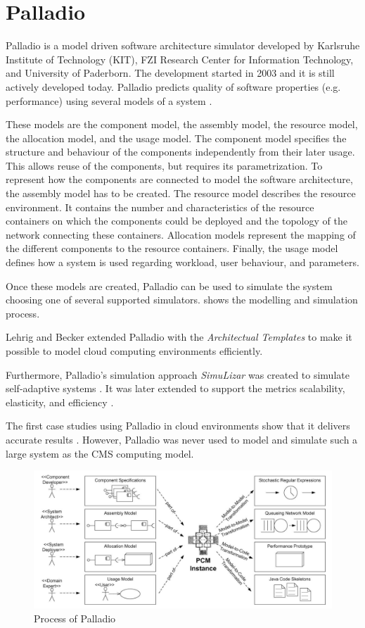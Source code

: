 \section{Palladio}
\label{palladio}
Palladio is a model driven software architecture simulator developed by Karlsruhe Institute of Technology (KIT), FZI Research Center for Information Technology, and University of Paderborn. The development started in 2003 and it is still actively developed today. Palladio predicts quality of software properties (e.g. performance) using several models of a system \cite{BECKER20093}.

These models are the component model, the assembly model, the resource model, the allocation model, and the usage model.
The component model specifies the structure and behaviour of the components independently from their later usage. This allows reuse of the components,  but requires its parametrization.
To represent how the components are connected to model the software architecture, the assembly model has to be created. 
The resource model describes the resource environment. It contains the number and characteristics of the resource containers on which the components could be deployed and the topology of the network connecting these containers.
Allocation models represent the mapping of the different components to the resource containers.
Finally, the usage model defines how a system is used regarding workload, user behaviour, and parameters.

Once these models are created, Palladio can be used to simulate the system choosing one of several supported simulators.  shows the modelling and simulation process. 

Lehrig and Becker \cite{arch} extended Palladio with the \textit{Architectual Templates} to make it possible to model cloud computing environments efficiently.

Furthermore, Palladio's simulation approach \textit{SimuLizar} was created to simulate self-adaptive systems \cite{becker2013simulizar}.
It was later extended to support the metrics scalability, elasticity, and efficiency \cite{arch}.

The first case studies using Palladio in cloud environments show that it delivers accurate results \cite{arch}. However, Palladio was never used to model and simulate such a large system as the CMS computing model.

\begin{figure}
	\centering
	\includegraphics[width=0.95\linewidth]{images/palladio}
	\caption[]{Process of Palladio \cite{BECKER20093}}
	\label{fig:palladio}
\end{figure}



